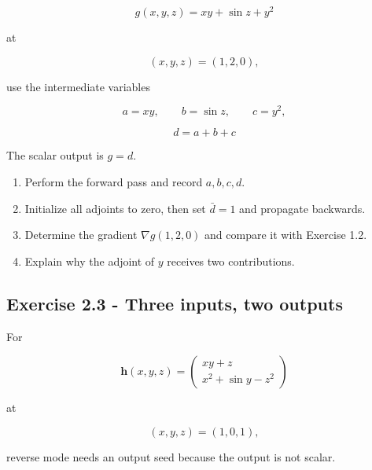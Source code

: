 \documentclass{course_sheet}
\begin{document}
\[
g(x,y,z)=xy+\sin z+y^2
\]

at

\[
(x,y,z)=(1,2,0),
\]

use the intermediate variables

\[
a=xy,
\qquad
b=\sin z,
\qquad
c=y^2,
\]

\[
d=a+b+c
\]

The scalar output is $g=d$.

\begin{enumerate}
\item
Perform the forward pass and record $a,b,c,d$.

\item
Initialize all adjoints to zero, then set $\bar d=1$ and propagate backwards.

\item
Determine the gradient $\nabla g(1,2,0)$ and compare it with Exercise 1.2.

\item
Explain why the adjoint of $y$ receives two contributions.

\end{enumerate}
\subsection*{Exercise 2.3 - Three inputs, two outputs}
For

\[
\mathbf h(x,y,z) = \begin{pmatrix} xy+z\\ x^2+\sin y-z^2\end{pmatrix}
\]

at

\[
(x,y,z)=(1,0,1),
\]

reverse mode needs an output seed because the output is not scalar.
\end{document}
